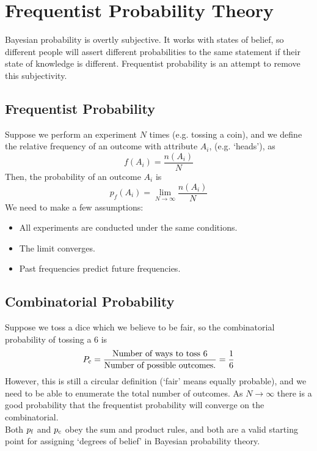 \documentclass{dwnotes}         		        %
\begin{document}
\section{Frequentist Probability Theory}
\label{sec:frequentistcrap}

Bayesian probability is overtly subjective. It works with states of
belief, so different people will assert different probabilities to the
same statement if their state of knowledge is different. Frequentist
probability is an attempt to remove this subjectivity.

\subsection{Frequentist Probability}
\label{sec:freqprob}

Suppose we perform an experiment $N$ times (e.g. tossing a coin), and we define the relative frequency of an outcome with attribute $A_i$, (e.g. `heads'), as 
\[ f(A_i) = \frac{n(A_i)}{N} \]
Then, the probability of an outcome $A_i$ is
\begin{equation}
  \label{eq:probfreq}
  p_f(A_i) = \lim_{N \to \infty} \frac{n(A_i)}{N}
\end{equation}
We need to make a few assumptions:
\begin{itemize}
\item All experiments are conducted under the same conditions.
\item The limit converges.
\item Past frequencies predict future frequencies.
\end{itemize}

\subsection{Combinatorial Probability}
\label{sec:combinprob}

Suppose we toss a dice which we believe to be fair, so the combinatorial probability of tossing a 6 is
\[ P_{\rm c} = \frac{\text{Number of ways to toss 6}}{\text{Number of
    possible outcomes.}} = \frac{1}{6} \] However, this is still a
circular definition (`fair' means equally probable), and we need to be
able to enumerate the total number of outcomes. As $N \to \infty$ there is a good probability that the frequentist probability will converge on the combinatorial.\\
Both $p_{\rm f}$ and $p_{\rm c}$ obey the sum and product rules, and
both are a valid starting point for assigning `degrees of belief' in
Bayesian probability theory.
\end{document}
